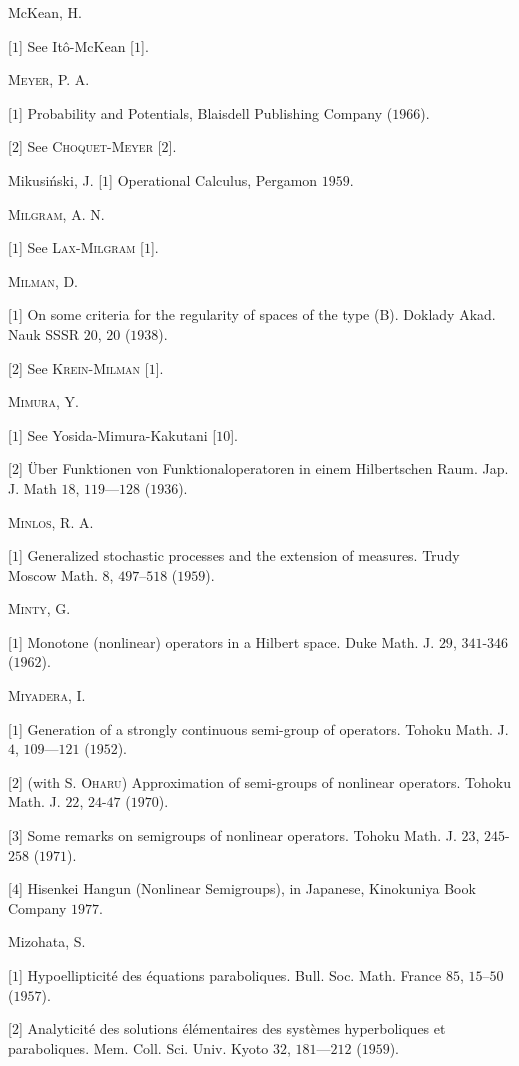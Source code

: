 McKean, H. 

[$1$] See Itô-McKean [$1$]. 

\textsc{Meyer}, P. A. 

[$1$] Probability and Potentials, Blaisdell Publishing Company ($1966$). 

[$2$] See \textsc{Choquet}-\textsc{Meyer} [$2$]. 

Mikusiński, J. [$1$] Operational Calculus, Pergamon $1959$. 

\textsc{Milgram}, A. N. 

[$1$] See \textsc{Lax}-\textsc{Milgram} [$1$]. 

\textsc{Milman}, D. 

[$1$] On some criteria for the regularity of spaces of the type (B). Doklady Akad. Nauk SSSR $20$, $20$ ($1938$). 

[$2$] See \textsc{Krein}-\textsc{Milman} [$1$]. 

\textsc{Mimura}, Y. 

[$1$] See Yosida-Mimura-Kakutani [$10$]. 

[$2$] Über Funktionen von Funktionaloperatoren in einem Hilbertschen Raum. Jap. J. Math $18$, $119$---$128$ ($1936$). 

\textsc{Minlos}, R. A. 

[$1$] Generalized stochastic processes and the extension of measures. Trudy Moscow Math. $8$, $497$--$518$ ($1959$). 

\textsc{Minty}, G. 

[$1$] Monotone (nonlinear) operators in a Hilbert space. Duke Math. J. $29$, $341$-$346$ ($1962$). 

\textsc{Miyadera}, I. 

[$1$] Generation of a strongly continuous semi-group of operators. Tohoku Math. J. $4$, $109$---$121$ ($1952$). 

[$2$] (with S. \textsc{Oharu}) Approximation of semi-groups of nonlinear operators. Tohoku Math. J. $22$, $24$-$47$ ($1970$). 

[$3$] Some remarks on semigroups of nonlinear operators. Tohoku Math. J. $23$, $245$-$258$ ($1971$). 

[$4$] Hisenkei Hangun (Nonlinear Semigroups), in Japanese, Kinokuniya Book Company $1977$. 

Mizohata, S. 

[$1$] Hypoellipticité des équations paraboliques. Bull. Soc. Math. France $85$, $15$--$50$ ($1957$). 

[$2$] Analyticité des solutions élémentaires des systèmes hyperboliques et paraboliques. Mem. Coll. Sci. Univ. Kyoto $32$, $181$---$212$ ($1959$). 

